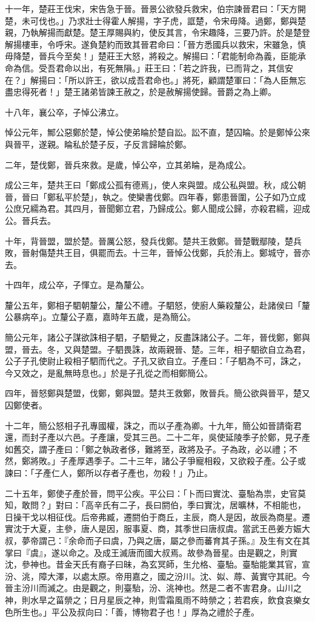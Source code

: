 \begin{pinyinscope}
十一年，楚莊王伐宋，宋告急于晉。晉景公欲發兵救宋，伯宗諫晉君曰：「天方開楚，未可伐也。」乃求壯士得霍人解揚，字子虎，誆楚，令宋毋降。過鄭，鄭與楚親，乃執解揚而獻楚。楚王厚賜與約，使反其言，令宋趣降，三要乃許。於是楚登解揚樓車，令呼宋。遂負楚約而致其晉君命曰：「晉方悉國兵以救宋，宋雖急，慎毋降楚，晉兵今至矣！」楚莊王大怒，將殺之。解揚曰：「君能制命為義，臣能承命為信。受吾君命以出，有死無隕。」莊王曰：「若之許我，已而背之，其信安在？」解揚曰：「所以許王，欲以成吾君命也。」將死，顧謂楚軍曰：「為人臣無忘盡忠得死者！」楚王諸弟皆諫王赦之，於是赦解揚使歸。晉爵之為上卿。

十八年，襄公卒，子悼公沸立。

悼公元年，鄦公惡鄭於楚，悼公使弟睔於楚自訟。訟不直，楚囚睔。於是鄭悼公來與晉平，遂親。睔私於楚子反，子反言歸睔於鄭。

二年，楚伐鄭，晉兵來救。是歲，悼公卒，立其弟睔，是為成公。

成公三年，楚共王曰「鄭成公孤有德焉」，使人來與盟。成公私與盟。秋，成公朝晉，晉曰「鄭私平於楚」，執之。使欒書伐鄭。四年春，鄭患晉圍，公子如乃立成公庶兄繻為君。其四月，晉聞鄭立君，乃歸成公。鄭人聞成公歸，亦殺君繻，迎成公。晉兵去。

十年，背晉盟，盟於楚。晉厲公怒，發兵伐鄭。楚共王救鄭。晉楚戰鄢陵，楚兵敗，晉射傷楚共王目，俱罷而去。十三年，晉悼公伐鄭，兵於洧上。鄭城守，晉亦去。

十四年，成公卒，子惲立。是為釐公。

釐公五年，鄭相子駟朝釐公，釐公不禮。子駟怒，使廚人藥殺釐公，赴諸侯曰「釐公暴病卒」。立釐公子嘉，嘉時年五歲，是為簡公。

簡公元年，諸公子謀欲誅相子駟，子駟覺之，反盡誅諸公子。二年，晉伐鄭，鄭與盟，晉去。冬，又與楚盟。子駟畏誅，故兩親晉、楚。三年，相子駟欲自立為君，公子子孔使尉止殺相子駟而代之。子孔又欲自立。子產曰：「子駟為不可，誅之，今又效之，是亂無時息也。」於是子孔從之而相鄭簡公。

四年，晉怒鄭與楚盟，伐鄭，鄭與盟。楚共王救鄭，敗晉兵。簡公欲與晉平，楚又囚鄭使者。

十二年，簡公怒相子孔專國權，誅之，而以子產為卿。十九年，簡公如晉請衛君還，而封子產以六邑。子產讓，受其三邑。二十二年，吳使延陵季子於鄭，見子產如舊交，謂子產曰：「鄭之執政者侈，難將至，政將及子。子為政，必以禮；不然，鄭將敗。」子產厚遇季子。二十三年，諸公子爭寵相殺，又欲殺子產。公子或諫曰：「子產仁人，鄭所以存者子產也，勿殺！」乃止。

二十五年，鄭使子產於晉，問平公疾。平公曰：「卜而曰實沈、臺駘為祟，史官莫知，敢問？」對曰：「高辛氏有二子，長曰閼伯，季曰實沈，居曠林，不相能也，日操干戈以相征伐。后帝弗臧，遷閼伯于商丘，主辰，商人是因，故辰為商星。遷實沈于大夏，主參，唐人是因，服事夏、商，其季世曰唐叔虞。當武王邑姜方娠大叔，夢帝謂己：『余命而子曰虞，乃與之唐，屬之參而蕃育其子孫。』及生有文在其掌曰『虞』，遂以命之。及成王滅唐而國大叔焉。故參為晉星。由是觀之，則實沈，參神也。昔金天氏有裔子曰昧，為玄冥師，生允格、臺駘。臺駘能業其官，宣汾、洮，障大澤，以處太原。帝用嘉之，國之汾川。沈、姒、蓐、黃實守其祀。今晉主汾川而滅之。由是觀之，則臺駘，汾、洮神也。然是二者不害君身。山川之神，則水旱之菑禜之；日月星辰之神，則雪霜風雨不時禜之；若君疾，飲食哀樂女色所生也。」平公及叔向曰：「善，博物君子也！」厚為之禮於子產。


\end{pinyinscope}
